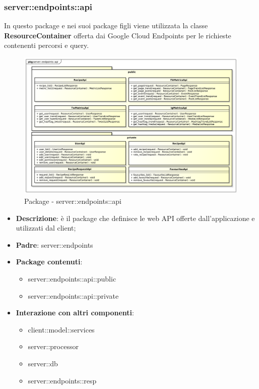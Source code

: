 \subsubsection{server::endpoints::api} %
\label{ssub:bdsm_app_server_endpoints_api}

	In questo package e nei suoi package figli viene utilizzata la classe \textbf{ResourceContainer} offerta dai Google Cloud Endpoints per le richieste contenenti percorsi e query.
\begin{figure}[!htbp]
	\centering
	\centerline{\includegraphics[scale=0.4]{./images/server/api.pdf}}
	\caption{Package - server::endpoints::api}
\end{figure}

\begin{itemize}
  \item \textbf{Descrizione}: è il package che definisce le web API offerte dall'applicazione e utilizzati dal client;
  \item \textbf{Padre}: server::endpoints
  \item \textbf{Package contenuti}:
  	\begin{itemize}
  		\item server::endpoints::api::public
  		\item server::endpoints::api::private
	\end{itemize}
  \item \textbf{Interazione con altri componenti}:
  	\begin{itemize}
  		\item client::model::services
  		\item server::processor
  		\item server::db
			\item server::endpoints::resp
	\end{itemize}
\end{itemize}

